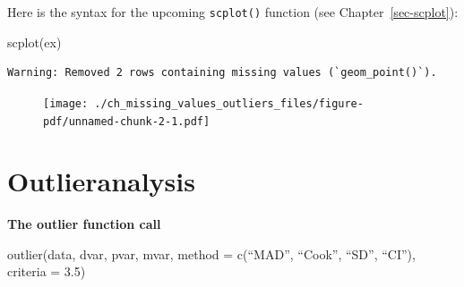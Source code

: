 \documentclass[
  letterpaper,
  DIV=11,
  numbers=noendperiod]{scrreprt}
\newenvironment{Shaded}{\begin{snugshade}}{\end{snugshade}}
\newcommand{\FunctionTok}[1]{\textcolor[rgb]{0.28,0.35,0.67}{#1}}
\newcommand{\NormalTok}[1]{\textcolor[rgb]{0.00,0.23,0.31}{#1}}
\begin{document}
Here is the syntax for the upcoming \texttt{scplot()} function (see
Chapter~\ref{sec-scplot}):

\begin{Shaded}
\begin{Highlighting}[]
\FunctionTok{scplot}\NormalTok{(ex)}
\end{Highlighting}
\end{Shaded}

\begin{verbatim}
Warning: Removed 2 rows containing missing values (`geom_point()`).
\end{verbatim}

\begin{figure}[H]

{\centering \texttt{[image: ./ch\_missing\_values\_outliers\_files/figure-pdf/unnamed-chunk-2-1.pdf]}

}

\end{figure}

\hypertarget{outlieranalysis}{%
\section{Outlieranalysis}\label{outlieranalysis}}

\begin{tcolorbox}[enhanced jigsaw, breakable, rightrule=.15mm, bottomrule=.15mm, arc=.35mm, colback=white, colframe=quarto-callout-tip-color-frame, opacityback=0, leftrule=.75mm, toprule=.15mm, left=2mm]
\begin{minipage}[t]{5.5mm}
\textcolor{quarto-callout-tip-color}{\faLightbulb}
\end{minipage}%
\begin{minipage}[t]{\textwidth - 5.5mm}

\textbf{The outlier function call}\vspace{2mm}

outlier(data, dvar, pvar, mvar, method = c(``MAD'', ``Cook'', ``SD'',
``CI''), criteria = 3.5)

\end{minipage}%
\end{tcolorbox}
\end{document}
